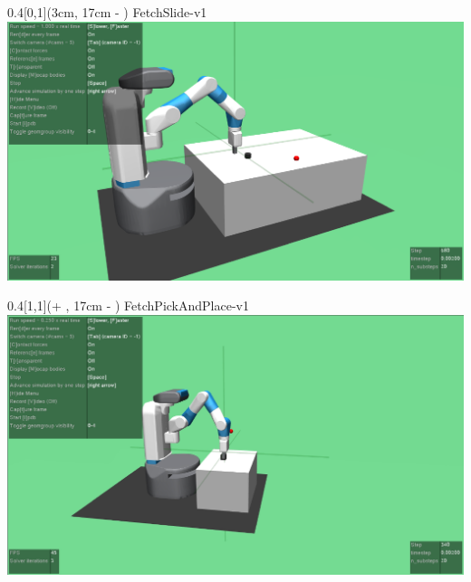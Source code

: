 \begin{frame}
	\begin{textblock*}{0.4\paperwidth}[0,1](3cm, 17cm - \PraesentationSeitenrand)%
		FetchSlide-v1
		\includegraphics[width=0.3\paperwidth]{./Ressourcen/Figures/FetchSlide-v1.pdf}
	\end{textblock*}
	
	\begin{textblock*}{0.4\paperwidth}[1,1](\textwidth + \PraesentationSeitenrand, 17cm - \PraesentationSeitenrand)%
		FetchPickAndPlace-v1
		\includegraphics[width=0.3\paperwidth]{./Ressourcen/Figures/FetchPickAndPlace-v1.pdf}
	\end{textblock*}
	
	
	
\end{frame}
\clearpage





